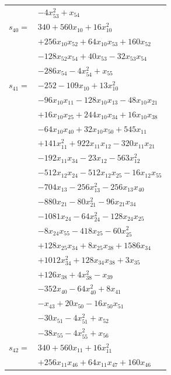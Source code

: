 \begin{longtable}{@{}r@{\;}l@{}}
 & \(\displaystyle -4x_{53}^{2} +x_{54}\) \\[3pt]
\(s_{40}=\) & \(\displaystyle 340 +560x_{10} +16x_{10}^{2}\) \\
 & \(\displaystyle +256x_{10}x_{52} +64x_{10}x_{53} +160x_{52}\) \\
 & \(\displaystyle -128x_{52}x_{54} +40x_{53} -32x_{53}x_{54}\) \\
 & \(\displaystyle -286x_{54} -4x_{54}^{2} +x_{55}\) \\[3pt]
\(s_{41}=\) & \(\displaystyle -252 -109x_{10} +13x_{10}^{2}\) \\
 & \(\displaystyle -96x_{10}x_{11} -128x_{10}x_{13} -48x_{10}x_{21}\) \\
 & \(\displaystyle +16x_{10}x_{25} +244x_{10}x_{34} +16x_{10}x_{38}\) \\
 & \(\displaystyle -64x_{10}x_{40} +32x_{10}x_{50} +545x_{11}\) \\
 & \(\displaystyle +141x_{11}^{2} +922x_{11}x_{12} -320x_{11}x_{21}\) \\
 & \(\displaystyle -192x_{11}x_{34} -23x_{12} -563x_{12}^{2}\) \\
 & \(\displaystyle -512x_{12}x_{24} -512x_{12}x_{25} -16x_{12}x_{55}\) \\
 & \(\displaystyle -704x_{13} -256x_{13}^{2} -256x_{13}x_{40}\) \\
 & \(\displaystyle -880x_{21} -80x_{21}^{2} -96x_{21}x_{34}\) \\
 & \(\displaystyle -1081x_{24} -64x_{24}^{2} -128x_{24}x_{25}\) \\
 & \(\displaystyle -8x_{24}x_{55} -418x_{25} -60x_{25}^{2}\) \\
 & \(\displaystyle +128x_{25}x_{34} +8x_{25}x_{38} +1586x_{34}\) \\
 & \(\displaystyle +1012x_{34}^{2} +128x_{34}x_{38} +3x_{35}\) \\
 & \(\displaystyle +126x_{38} +4x_{38}^{2} -x_{39}\) \\
 & \(\displaystyle -352x_{40} -64x_{40}^{2} +8x_{41}\) \\
 & \(\displaystyle -x_{43} +20x_{50} -16x_{50}x_{51}\) \\
 & \(\displaystyle -30x_{51} -4x_{51}^{2} +x_{52}\) \\
 & \(\displaystyle -38x_{55} -4x_{55}^{2} +x_{56}\) \\[3pt]
\(s_{42}=\) & \(\displaystyle 340 +560x_{11} +16x_{11}^{2}\) \\
 & \(\displaystyle +256x_{11}x_{46} +64x_{11}x_{47} +160x_{46}\) \\

\end{longtable}
